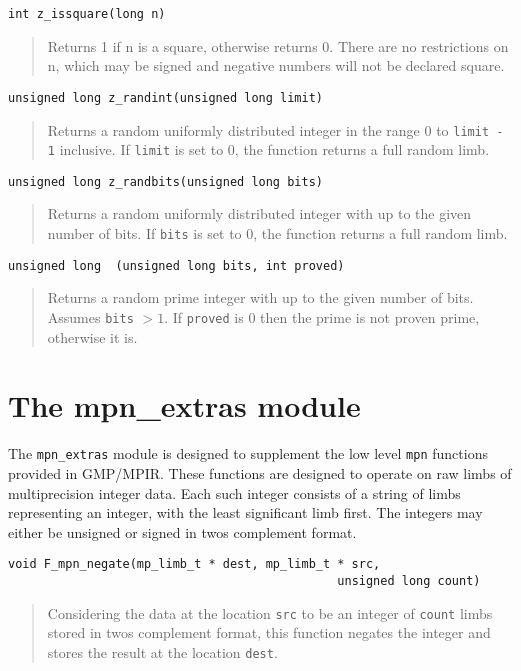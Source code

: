 \documentclass[a4paper,10pt]{article}
\newcommand{\code}{\lstinline}
\begin{document}
\begin{lstlisting}
int z_issquare(long n)
\end{lstlisting}
\begin{quote}
Returns 1 if n is a square, otherwise returns 0. There are no restrictions on n, which may be signed and negative numbers will not be declared square. 
\end{quote}

\begin{lstlisting}
unsigned long z_randint(unsigned long limit)
\end{lstlisting}
\begin{quote}
Returns a random uniformly distributed integer in the range 0 to \code{limit - 1} inclusive. If \code{limit} is set to 0, the function returns a full random limb.
\end{quote}
 
\begin{lstlisting}
unsigned long z_randbits(unsigned long bits)
\end{lstlisting}
\begin{quote}
Returns a random uniformly distributed integer with up to the given number of bits. If \code{bits} is set to 0, the function returns a full random limb.
\end{quote}

\begin{lstlisting}
unsigned long  (unsigned long bits, int proved)
\end{lstlisting}
\begin{quote}
Returns a random prime integer with up to the given number of bits.  Assumes \code{bits} $> 1$. If \code{proved} is 0 then the prime is not proven prime, otherwise it is.
\end{quote}

\section{The mpn\_extras module}

The \code{mpn_extras} module is designed to supplement the low level \code{mpn} functions provided in GMP/MPIR. These functions are designed to operate on raw limbs of multiprecision integer data. Each such integer consists of a string of limbs representing an integer, with the least significant limb first. The integers may either be unsigned or signed in twos complement format.

\begin{lstlisting}
void F_mpn_negate(mp_limb_t * dest, mp_limb_t * src, 
                                              unsigned long count)
\end{lstlisting}
\begin{quote}
Considering the data at the location \code{src} to be an integer of \code{count} limbs stored in twos complement format, this function negates the integer and stores the result at the location \code{dest}.
\end{quote}
\end{document}
